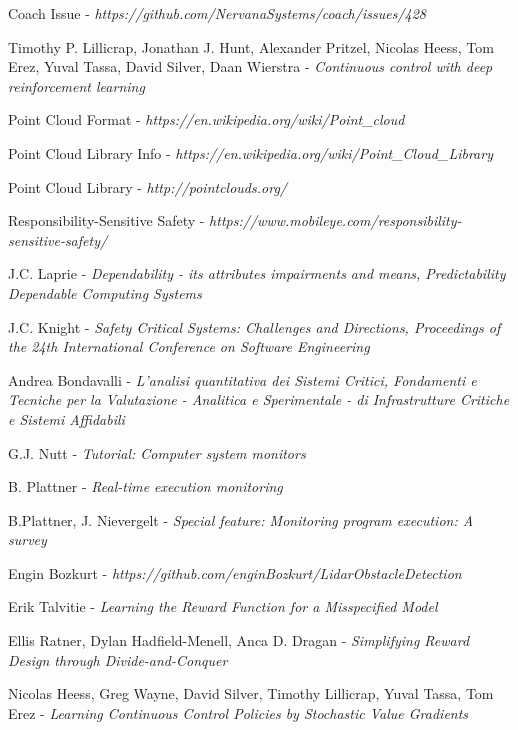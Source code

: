 \begin{thebibliography}{9}
Coach Issue - \textit{https://github.com/NervanaSystems/coach/issues/428}

Timothy P. Lillicrap, Jonathan J. Hunt, Alexander Pritzel, Nicolas Heess, Tom Erez, Yuval Tassa, David Silver, Daan Wierstra - \textit{Continuous control with deep reinforcement learning}

Point Cloud Format - \textit{https://en.wikipedia.org/wiki/Point\_cloud}

Point Cloud Library Info - \textit{https://en.wikipedia.org/wiki/Point\_Cloud\_Library}

Point Cloud Library - \textit{http://pointclouds.org/}

Responsibility-Sensitive Safety - \textit{https://www.mobileye.com/responsibility-sensitive-safety/}

J.C. Laprie - \textsl{Dependability - its attributes impairments and means, Predictability Dependable Computing Systems}

J.C. Knight - \textsl{Safety Critical Systems: Challenges and Directions, Proceedings of the 24th International Conference on Software Engineering}

Andrea Bondavalli - \textsl{L'analisi quantitativa dei Sistemi Critici, Fondamenti e Tecniche per la Valutazione - Analitica e Sperimentale - di Infrastrutture Critiche e Sistemi Affidabili}

G.J. Nutt - \textsl{Tutorial: Computer system monitors}

B. Plattner - \textsl{Real-time execution monitoring}

B.Plattner, J. Nievergelt - \textsl{Special feature: Monitoring program execution: A survey}

Engin Bozkurt - \textsl{https://github.com/enginBozkurt/LidarObstacleDetection}

Erik Talvitie - \textsl{Learning the Reward Function for a Misspecified Model}

Ellis Ratner, Dylan Hadfield-Menell, Anca D. Dragan - \textsl{Simplifying Reward Design	through Divide-and-Conquer}

Nicolas Heess, Greg Wayne, David Silver, Timothy Lillicrap, Yuval Tassa, Tom Erez - \textsl{Learning Continuous Control Policies by Stochastic Value Gradients}

\end{thebibliography}